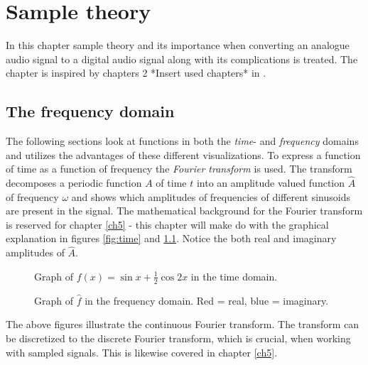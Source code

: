 \chapter{Sample theory} \label{ch4}
In this chapter sample theory and its importance when converting an analogue audio signal to a digital audio signal along with its complications is treated. The chapter is inspired by chapters 2 *Insert used chapters* in \cite{pelgrom}.
\section{The frequency domain}
The following sections look at functions in both the \textit{time}- and \textit{frequency} domains and utilizes the advantages of these different visualizations. To express a function of time as a function of frequency the \textit{Fourier transform} is used. The transform decomposes a periodic function $A$ of time $t$ into an amplitude valued function $\hat{A}$ of frequency $\omega$ and shows which amplitudes of frequencies of different sinusoids are present in the signal. The mathematical background for the Fourier transform is reserved for chapter \ref{ch5} - this chapter will make do with the graphical explanation in figures \ref{fig:time} and \ref{fig:freq}. Notice the both real and imaginary amplitudes of $\hat{A}$.
\begin{figure}[H]
\centering
\begin{minipage}{0.49\textwidth}
\centering
{}
\caption{Graph of $f(x)=\sin x + \frac{1}{2} \cos 2x$ in the time domain.}
\label{fig:time}
\end{minipage}
\centering
\begin{minipage}{0.49\textwidth}
\centering
{}
\caption{Graph of $\hat{f}$ in the frequency domain. Red = real, blue = imaginary.}
\label{fig:freq}
\end{minipage}
\end{figure}
The above figures illustrate the continuous Fourier transform. The transform can be discretized to the discrete Fourier transform, which is crucial, when working with sampled signals. This is likewise covered in chapter \ref{ch5}.
